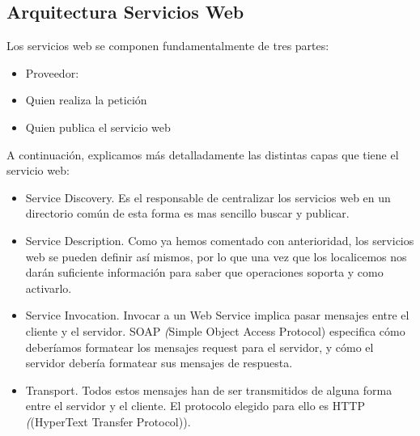 \subsection{Arquitectura Servicios Web}
\label{cap:subsec:arquitecturaserviciosweb}
Los servicios web se componen fundamentalmente de tres partes:
\begin{itemize}
	\item Proveedor:
	\item Quien realiza la petición
	\item Quien publica el servicio web
	
\end{itemize}
 A continuación,
explicamos más detalladamente las distintas capas que tiene el servicio web:
\begin{itemize}
 \item Service Discovery. Es el responsable de centralizar los servicios web en un directorio común de esta forma es mas sencillo buscar y publicar.
 \item Service Description. Como ya hemos comentado con anterioridad, los servicios web se pueden definir así mismos, por lo que una vez que los localicemos nos darán suficiente información para saber que operaciones soporta y como activarlo.
 \item Service Invocation. Invocar a un Web Service implica pasar mensajes entre el cliente y el servidor. SOAP  \textit({Simple Object Access Protocol}) especifica cómo deberíamos formatear los mensajes request para el servidor, y cómo el servidor debería formatear sus mensajes de respuesta.
 \item Transport. Todos estos mensajes han de ser transmitidos de alguna forma entre el servidor y el cliente. El protocolo elegido para ello es HTTP  \textit({(HyperText Transfer Protocol)}). 
\end{itemize}

